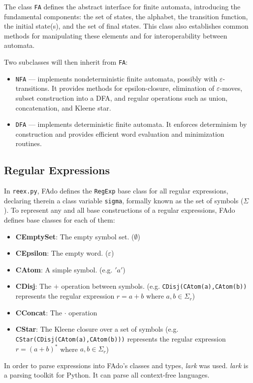 


The class \texttt{FA} defines the abstract interface for finite automata, introducing the fundamental components: the set of states, the alphabet, the transition function, the initial state(s), and the set of final states. This class also establishes common methods for manipulating these elements and for interoperability between automata.

Two subclasses will then inherit from \texttt{FA}:
\begin{itemize}
	\item \texttt{NFA} --- implements nondeterministic finite automata, possibly with $\varepsilon$-transitions. It provides methods for epsilon-closure, elimination of $\varepsilon$-moves, subset construction into a DFA, and regular operations such as union, concatenation, and Kleene star.
	\item \texttt{DFA} --- implements deterministic finite automata. It enforces determinism by construction and provides efficient word evaluation and minimization routines.
\end{itemize}

\subsection{Regular Expressions}
In \texttt{reex.py}, FAdo defines the \texttt{RegExp} base class for all regular expressions, declaring therein a class variable \texttt{sigma}, formally known as the set of symbols ($\Sigma$).
To represent any and all base constructions of a regular expressions, FAdo defines base classes for each of them:
\begin{itemize}
    \item \textbf{CEmptySet}: The empty symbol set. ($\emptyset$)
    \item \textbf{CEpsilon}: The empty word. ($\varepsilon$)
    \item \textbf{CAtom}: A simple symbol. (e.g. $'a'$)
    \item \textbf{CDisj}: The $+$ operation between symbols. (e.g. \texttt{CDisj(CAtom(a),CAtom(b))} represents the regular expression $r=a+b$ where $a,b \in \Sigma_r$)
    \item \textbf{CConcat}: The $\cdot$ operation 
    \item \textbf{CStar}: The Kleene closure over a set of symbols (e.g. \texttt{CStar(CDisj(CAtom(a),CAtom(b)))} represents the regular expression $r=(a+b)^*$ where $a,b \in \Sigma_r$)

\end{itemize}

In order to parse expressions into FAdo's classes and types, \emph{lark} was used. \emph{lark} is a parsing toolkit for Python. It can parse all context-free languages.



